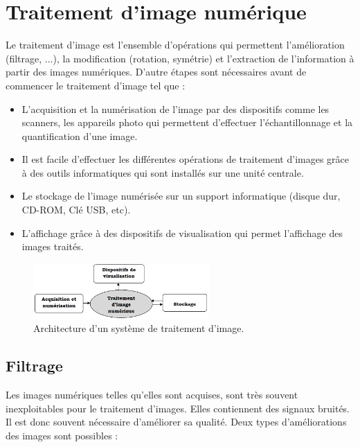 \section{Traitement d'image numérique}
Le traitement d'image est l’ensemble d’opérations qui permettent
l’amélioration (filtrage, ...), la modification (rotation, symétrie) et l’extraction de l’information à partir des images numériques.
D'autre étapes sont nécessaires avant de commencer le traitement d’image
tel que :
\begin{itemize}
	\item L’acquisition et la numérisation de l’image par des dispositifs comme les scanners, les appareils photo qui permettent d’effectuer l’échantillonnage et la quantification d’une image.
	
	\item Il est facile d’effectuer les différentes opérations de traitement d’images grâce à des outils informatiques qui sont installés sur une unité centrale.
	
	\item Le stockage de l’image numérisée sur un support informatique (disque dur, CD-ROM, Clé USB, etc).
	
	\item L’affichage grâce à des dispositifs de visualisation qui permet l’affichage des images traités.
\end{itemize}

\begin{figure}[H]
	\centering
	\includegraphics[width=0.6\textwidth]{Figures/tin} 
	\caption{Architecture d'un système de traitement d’image.}
\end{figure}

\subsection{Filtrage}
Les images numériques telles qu'elles sont acquises, sont très souvent
inexploitables pour le traitement d'images. Elles contiennent des signaux
bruités. Il est donc souvent nécessaire d'améliorer sa qualité. Deux types
d’améliorations des images sont possibles :


